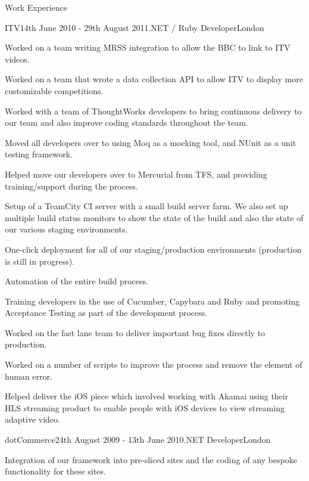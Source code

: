 \documentclass{resume}
\begin{document}
\begin{rSection}{Work Experience}
    \begin{rSubsection}{ITV}{14th June 2010 - 29th August 2011}{.NET / Ruby Developer}{London}
      \item Worked on a team writing MRSS integration to allow the BBC to link to ITV videos.
      \item Worked on a team that wrote a data collection API to allow ITV to display more customizable competitions.
      \item Worked with a team of ThoughtWorks developers to bring continuous delivery to our team and also improve coding standards throughout the team.
      \item Moved all developers over to using Moq as a mocking tool, and NUnit as a unit testing framework.
      \item Helped move our developers over to Mercurial from TFS, and providing training/support during the process.
      \item Setup of a TeamCity CI server with a small build server farm. We also set up multiple build status monitors to show the state of the build and also the state of our various staging environments.
      \item One-click deployment for all of our staging/production environments (production is still in progress).
      \item Automation of the entire build process.
      \item Training developers in the use of Cucumber, Capybara and Ruby and promoting Acceptance Testing as part of the development process.
      \item Worked on the fast lane team to deliver important bug fixes directly to production.
      \item Worked on a number of scripts to improve the process and remove the element of human error.
      \item Helped deliver the iOS piece which involved working with Akamai using their HLS streaming product to enable people with iOS devices to view streaming adaptive video.
    \end{rSubsection}

    \begin{rSubsection}{dotCommerce}{24th August 2009 - 13th June 2010}{.NET Developer}{London}
      \item Integration of our framework into pre-sliced sites and the coding of any bespoke functionality for these sites.
    \end{rSubsection}


\end{rSection}
\end{document}
